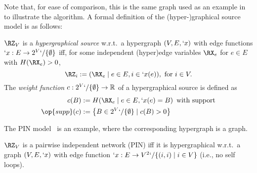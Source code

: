 \documentclass[conference,letterpaper]{IEEEtran}
\begin{document}
Note that, for ease of comparison, this is the same graph used as an example in \cite{kolmogorov10} to illustrate the algorithm. A formal definition of the (hyper-)graphical source model is as follows:
%
\begin{Definition}
	\label{def:hyp}
	$\RZ_V$ is a \emph{hypergraphical source} w.r.t.\  a hypergraph $(V,E,`x)$ with edge functions $`x: E\to2^V`/\{\emptyset\}$ iff, for some independent (hyper)edge variables $\RX_e$ for $e\in E$ with $H(\RX_e)>0$,
	\begin{equation}
	\RZ_i:=(\RX_e\mid  e\in E, i\in`x(e)), \text{ for } i\in V. \label{eq:Xe}
	\end{equation}
	The \emph{weight function} $c:2^V`/\{\emptyset\}\to\mathbb{R}$ of a hypergraphical source is defined as
	\begin{subequations}
		\label{eq:c}
		\begin{align}
			c(B)&:=H(\RX_e\mid e\in E,`x(e)=B) \kern.5em \text{with support}\kern-.5em\\
			\kern-.5em \op{supp}(c)&:=\Set*{B\in 2^V`/\{\emptyset\} \mid c(B)>0}
		\end{align}
	\end{subequations}
\end{Definition}
The PIN model~\cite{nitinawarat10} is an example, where the corresponding hypergraph is a graph.
\begin{Definition}
	\label{def:PIN}
	$\RZ_V$ is a pairwise independent network (PIN) iff it is hypergraphical w.r.t.\  a graph $(V,E,`x)$ with edge function $`x: E\to V^2`/\{(i,i)\mid i\in V\}$ (i.e., no self loops).
\end{Definition}
\end{document}
